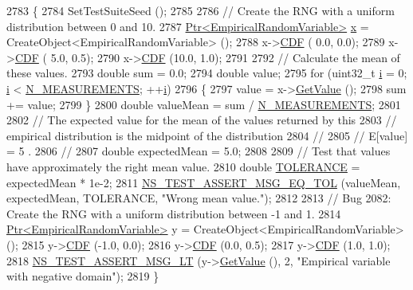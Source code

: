 \begin{DoxyCode}
2783 \{
2784   SetTestSuiteSeed ();
2785 
2786   \textcolor{comment}{// Create the RNG with a uniform distribution between 0 and 10.}
2787   \hyperlink{classns3_1_1Ptr}{Ptr<EmpiricalRandomVariable>} \hyperlink{lte__link__budget__x2__handover__measures_8m_a9336ebf25087d91c818ee6e9ec29f8c1}{x} = CreateObject<EmpiricalRandomVariable> ();
2788   x->\hyperlink{classns3_1_1EmpiricalRandomVariable_a1f85096a98576ebe48417698f191805d}{CDF} ( 0.0,  0.0);
2789   x->\hyperlink{classns3_1_1EmpiricalRandomVariable_a1f85096a98576ebe48417698f191805d}{CDF} ( 5.0,  0.5);
2790   x->\hyperlink{classns3_1_1EmpiricalRandomVariable_a1f85096a98576ebe48417698f191805d}{CDF} (10.0,  1.0);
2791 
2792   \textcolor{comment}{// Calculate the mean of these values.}
2793   \textcolor{keywordtype}{double} sum = 0.0;
2794   \textcolor{keywordtype}{double} value;
2795   \textcolor{keywordflow}{for} (uint32\_t \hyperlink{bernuolliDistribution_8m_a6f6ccfcf58b31cb6412107d9d5281426}{i} = 0; \hyperlink{bernuolliDistribution_8m_a6f6ccfcf58b31cb6412107d9d5281426}{i} < \hyperlink{classRandomVariableStreamEmpiricalTestCase_af8f4a8c6d7df99808673e6bbde2d7ddc}{N\_MEASUREMENTS}; ++\hyperlink{bernuolliDistribution_8m_a6f6ccfcf58b31cb6412107d9d5281426}{i})
2796     \{
2797       value = x->\hyperlink{classns3_1_1EmpiricalRandomVariable_a1a2d5b20db4509d1518727eb725672f7}{GetValue} ();
2798       sum += value;
2799     \}
2800   \textcolor{keywordtype}{double} valueMean = sum / \hyperlink{classRandomVariableStreamEmpiricalTestCase_af8f4a8c6d7df99808673e6bbde2d7ddc}{N\_MEASUREMENTS};
2801 
2802   \textcolor{comment}{// The expected value for the mean of the values returned by this}
2803   \textcolor{comment}{// empirical distribution is the midpoint of the distribution}
2804   \textcolor{comment}{//}
2805   \textcolor{comment}{//     E[value]  =  5 .}
2806   \textcolor{comment}{//                          }
2807   \textcolor{keywordtype}{double} expectedMean = 5.0;
2808 
2809   \textcolor{comment}{// Test that values have approximately the right mean value.}
2810   \textcolor{keywordtype}{double} \hyperlink{spectrum-value-test_8cc_a30c17564229ec2e37dfea9c6c9ad643e}{TOLERANCE} = expectedMean * 1e-2;
2811   \hyperlink{group__testing_ga9e7861b56b4e70db3b56044cb7a28e41}{NS\_TEST\_ASSERT\_MSG\_EQ\_TOL} (valueMean, expectedMean, TOLERANCE, \textcolor{stringliteral}{"Wrong mean
       value."}); 
2812 
2813   \textcolor{comment}{// Bug 2082: Create the RNG with a uniform distribution between -1 and 1.}
2814   \hyperlink{classns3_1_1Ptr}{Ptr<EmpiricalRandomVariable>} y = CreateObject<EmpiricalRandomVariable> ();
2815   y->\hyperlink{classns3_1_1EmpiricalRandomVariable_a1f85096a98576ebe48417698f191805d}{CDF} (-1.0,  0.0);
2816   y->\hyperlink{classns3_1_1EmpiricalRandomVariable_a1f85096a98576ebe48417698f191805d}{CDF} (0.0,  0.5);
2817   y->\hyperlink{classns3_1_1EmpiricalRandomVariable_a1f85096a98576ebe48417698f191805d}{CDF} (1.0,  1.0);
2818   \hyperlink{group__testing_ga1d96848b91407c9a0b36583e8b0ad7ae}{NS\_TEST\_ASSERT\_MSG\_LT} (y->\hyperlink{classns3_1_1EmpiricalRandomVariable_a1a2d5b20db4509d1518727eb725672f7}{GetValue} (), 2, \textcolor{stringliteral}{"Empirical variable with negative
       domain"});
2819 \}
\end{DoxyCode}


